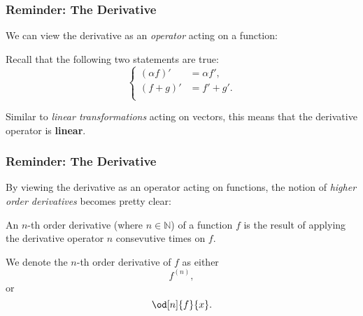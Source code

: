 \begin{frame}
	\frametitle{Reminder: The Derivative}
	We can view the derivative as an \emph{operator} acting on a function:

	\vspace{5mm}
	\centering
	\flushleft

	\vspace{5mm}
	Recall that the following two statements are true:
	\begin{equation*}
		\begin{cases}
			\left( \alpha f \right)' &= \alpha f',\\
			\left( f+g \right)' &= f' + g'.\\
		\end{cases}
	\end{equation*}

	Similar to \emph{linear transformations} acting on vectors, this means that the derivative operator is \textbf{linear}.
\end{frame}

\begin{frame}
	\frametitle{Reminder: The Derivative}
	By viewing the derivative as an operator acting on functions, the notion of \emph{higher order derivatives} becomes pretty clear:
	\begin{presentation_definition}
		An $n$-th order derivative (where $n\in\mathbb{N}$) of a function $f$ is the result of applying the derivative operator $n$ consevutive times on $f$.
	\end{presentation_definition}

	We denote the $n$-th order derivative of $f$ as either
	\begin{equation*}
		f^{(n)},
	\end{equation*}
	or
	\begin{equation*}
		\od[n]{f}{x}.
	\end{equation*}
\end{frame}

